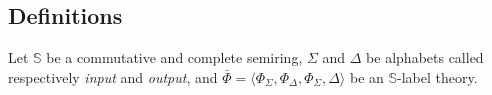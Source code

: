\documentclass[runningheads]{llncs}
\def\<#1>{\langle #1 \rangle}
\newcommand{\Semiring}{\mathbb{S}}
\begin{document}
%






\subsection{Definitions} \label{sec:SWTdef}\label{sec:SWAdef}

Let $\Semiring$ be a commutative and complete semiring, 
$\Sigma$ and $\Delta$ be alphabets called respectively \emph{input} and \emph{output}, %
and $\bar\Phi = \< \Phi_\Sigma, \Phi_\Delta, \Phi_{\Sigma, \Delta}>$ be an $\Semiring$-label theory.
\end{document}
